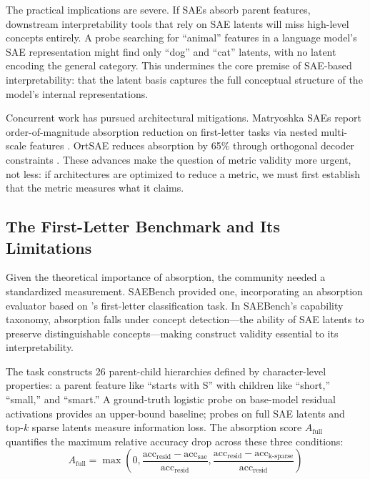\documentclass{article}
\begin{document}
The practical implications are severe. If SAEs absorb parent features, downstream interpretability tools that rely on SAE latents will miss high-level concepts entirely. A probe searching for ``animal'' features in a language model's SAE representation might find only ``dog'' and ``cat'' latents, with no latent encoding the general category. This undermines the core premise of SAE-based interpretability: that the latent basis captures the full conceptual structure of the model's internal representations.

Concurrent work has pursued architectural mitigations. Matryoshka SAEs report order-of-magnitude absorption reduction on first-letter tasks via nested multi-scale features \citep{bussmann2025matryoshka}. OrtSAE reduces absorption by 65\% through orthogonal decoder constraints \citep{korznikov2025ortsae}. These advances make the question of metric validity more urgent, not less: if architectures are optimized to reduce a metric, we must first establish that the metric measures what it claims.

\subsection{The First-Letter Benchmark and Its Limitations}

Given the theoretical importance of absorption, the community needed a standardized measurement. SAEBench \citep{karvonen2025saebench} provided one, incorporating an absorption evaluator based on \citet{chanin2024feature}'s first-letter classification task. In SAEBench's capability taxonomy, absorption falls under concept detection---the ability of SAE latents to preserve distinguishable concepts---making construct validity essential to its interpretability.

The task constructs 26 parent-child hierarchies defined by character-level properties: a parent feature like ``starts with S'' with children like ``short,'' ``small,'' and ``smart.'' A ground-truth logistic probe on base-model residual activations provides an upper-bound baseline; probes on full SAE latents and top-$k$ sparse latents measure information loss. The absorption score $A_{\text{full}}$ quantifies the maximum relative accuracy drop across these three conditions:
\begin{equation}
A_{\text{full}} = \max\left(0, \frac{\text{acc}_{\text{resid}} - \text{acc}_{\text{sae}}}{\text{acc}_{\text{resid}}}, \frac{\text{acc}_{\text{resid}} - \text{acc}_{\text{k-sparse}}}{\text{acc}_{\text{resid}}}\right)
\end{equation}
\end{document}
